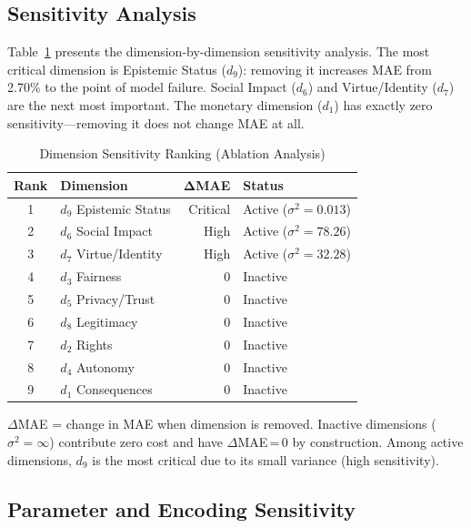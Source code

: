 \documentclass[journal]{IEEEtran}
\begin{document}
\subsection{Sensitivity Analysis}

Table~\ref{tab:sensitivity} presents the dimension-by-dimension sensitivity analysis.
The most critical dimension is Epistemic Status ($d_9$): removing it increases MAE from 2.70\% to the point of model failure.
Social Impact ($d_6$) and Virtue/Identity ($d_7$) are the next most important.
The monetary dimension ($d_1$) has exactly zero sensitivity---removing it does not change MAE at all.

\begin{table}[!t]
\renewcommand{\arraystretch}{1.15}
\caption{Dimension Sensitivity Ranking (Ablation Analysis)}
\label{tab:sensitivity}
\centering
\begin{tabular}{c l r l}
\toprule
\textbf{Rank} & \textbf{Dimension} & $\boldsymbol{\Delta}$\textbf{MAE} & \textbf{Status} \\
\midrule
1 & $d_9$ Epistemic Status   & Critical & Active ($\sigma^2=0.013$) \\
2 & $d_6$ Social Impact      & High     & Active ($\sigma^2=78.26$) \\
3 & $d_7$ Virtue/Identity    & High     & Active ($\sigma^2=32.28$) \\
4 & $d_3$ Fairness           & 0        & Inactive \\
5 & $d_5$ Privacy/Trust      & 0        & Inactive \\
6 & $d_8$ Legitimacy         & 0        & Inactive \\
7 & $d_2$ Rights             & 0        & Inactive \\
8 & $d_4$ Autonomy           & 0        & Inactive \\
9 & $d_1$ Consequences       & 0        & Inactive \\
\bottomrule
\end{tabular}
\begin{flushleft}
\footnotesize{$\Delta$MAE = change in MAE when dimension is removed.
Inactive dimensions ($\sigma^2 = \infty$) contribute zero cost and have $\Delta$MAE\,=\,0 by construction.
Among active dimensions, $d_9$ is the most critical due to its small variance (high sensitivity).}
\end{flushleft}
\end{table}

\subsection{Parameter and Encoding Sensitivity}
\end{document}
